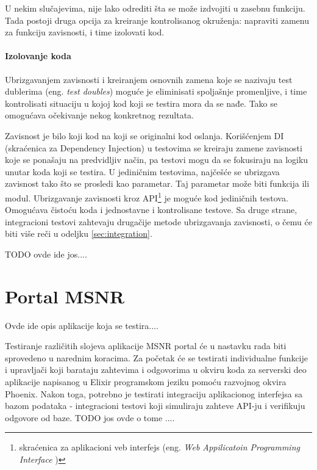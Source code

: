 \documentclass[12pt,oneside]{memoir}
\begin{document}
\par  U nekim slučajevima, nije lako odrediti šta se može izdvojiti u zasebnu funkciju. Tada postoji druga opcija za kreiranje kontrolisanog okruženja: napraviti zamenu za funkciju zavisnosti, i time izolovati kod. 

\subsubsection{Izolovanje koda} 
\par Ubrizgavanjem zavisnosti i kreiranjem osnovnih zamena koje se nazivaju test dublerima (eng. \emph{test doubles}) moguće je eliminisati spoljašnje promenljive, i time kontrolisati situaciju u kojoj kod koji se testira mora da se nađe. Tako se omogućava očekivanje nekog konkretnog rezultata. 
\par Zavisnost je bilo koji kod na koji se originalni kod oslanja. Korišćenjem DI (skraćenica za Dependency Injection) u testovima se kreiraju zamene zavisnosti koje se ponašaju na predvidljiv način, pa testovi mogu da se fokusiraju na logiku unutar koda koji se testira. U jediničnim testovima, najčešće se ubrizgava zavisnost tako što se prosledi kao parametar. Taj parametar može biti funkcija ili modul. Ubrizgavanje zavisnosti kroz API\footnote{skraćenica za aplikacioni veb interfejs (eng. \textit{Web Appilicatoin
Programming Interface} )} je moguće kod jediničnih testova. Omogućava čistoću koda i jednostavne i kontrolisane testove. Sa druge strane, integracioni testovi zahtevaju drugačije metode ubrizgavanja zavisnosti, o čemu će biti više reči u odeljku \ref{sec:integration}.

\par TODO ovde ide jos....

\chapter{Portal MSNR}
\label{chp:msnr}

\par Ovde ide opis aplikacije koja se testira.... \cite{msnr-portal} \cite{rad}

\par Testiranje različitih slojeva aplikacije MSNR portal će u nastavku rada biti sprovedeno u narednim koracima. Za početak će se testirati individualne funkcije i upravljači koji barataju zahtevima i odgovorima u okviru koda za serverski deo aplikacije napisanog u Elixir programskom jeziku pomoću razvojnog okvira Phoenix. Nakon toga, potrebno je testirati integraciju aplikacionog interfejsa sa bazom podataka - integracioni testovi koji simuliraju zahteve API-ju i verifikuju odgovore od baze. TODO jos ovde o tome .... 
\end{document}
